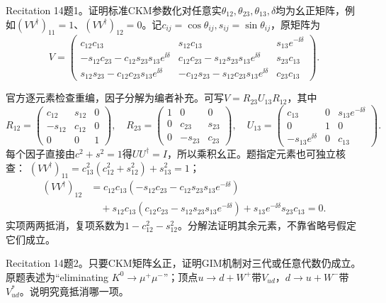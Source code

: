 \begin{exercise}\label{ex:rec-14-1}
Recitation 14题1。证明标准CKM参数化对任意实$\theta_{12},\theta_{23},\theta_{13},\delta$均为幺正矩阵，例如$(VV^\dagger)_{11}=1$、$(VV^\dagger)_{12}=0$。记$c_{ij}=\cos\theta_{ij},s_{ij}=\sin\theta_{ij}$，原矩阵为
\begin{equation}
 V=\begin{pmatrix}
 c_{12}c_{13}&s_{12}c_{13}&s_{13}e^{-\ii\delta}\\
 -s_{12}c_{23}-c_{12}s_{23}s_{13}e^{\ii\delta}&
 c_{12}c_{23}-s_{12}s_{23}s_{13}e^{\ii\delta}&s_{23}c_{13}\\
 s_{12}s_{23}-c_{12}c_{23}s_{13}e^{\ii\delta}&
 -c_{12}s_{23}-s_{12}c_{23}s_{13}e^{\ii\delta}&c_{23}c_{13}
 \end{pmatrix}.
\end{equation}
\end{exercise}
\begin{solution}
官方逐元素检查重编，因子分解为编者补充。可写$V=R_{23}U_{13}R_{12}$，其中
\begin{equation}
 R_{12}=\begin{pmatrix}c_{12}&s_{12}&0\\-s_{12}&c_{12}&0\\0&0&1\end{pmatrix},\quad
 R_{23}=\begin{pmatrix}1&0&0\\0&c_{23}&s_{23}\\0&-s_{23}&c_{23}\end{pmatrix},\quad
 U_{13}=\begin{pmatrix}c_{13}&0&s_{13}e^{-\ii\delta}\\0&1&0\\-s_{13}e^{\ii\delta}&0&c_{13}\end{pmatrix}.
\end{equation}
每个因子直接由$c^2+s^2=1$得$UU^\dagger=I$，所以乘积幺正。题指定元素也可独立核查：
$(VV^\dagger)_{11}=c_{13}^2(c_{12}^2+s_{12}^2)+s_{13}^2=1$；
\begin{align*}
 (VV^\dagger)_{12}
 &=c_{12}c_{13}(-s_{12}c_{23}-c_{12}s_{23}s_{13}e^{-\ii\delta})\\
 &\quad+s_{12}c_{13}(c_{12}c_{23}-s_{12}s_{23}s_{13}e^{-\ii\delta})
   +s_{13}e^{-\ii\delta}s_{23}c_{13}=0.
\end{align*}
实项两两抵消，复项系数为$1-c_{12}^2-s_{12}^2$。分解法证明其余元素，不靠省略号假定它们成立。
\end{solution}
\begin{exercise}\label{ex:rec-14-2}
Recitation 14题2。只要CKM矩阵幺正，证明GIM机制对三代或任意代数仍成立。原题表述为“eliminating $K^0\to\mu^+\mu^-$”；顶点$u\to d+W^+$带$V_{ud}$，$d\to u+W^-$带$V_{ud}^*$。说明究竟抵消哪一项。
\end{exercise}

